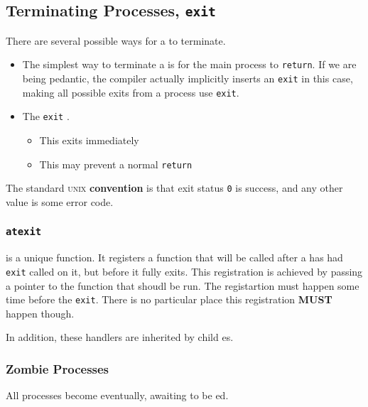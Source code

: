 \subsection{Terminating Processes, \texttt{exit}}\label{subsec:Terminating_Processes-exit}
There are several possible ways for a  to terminate.

\begin{itemize}[noitemsep]
\item The simplest way to terminate a  is for the main process to \texttt{return}.
  If we are being pedantic, the compiler actually implicitly inserts an \texttt{exit} in this case, making all possible exits from a process use \texttt{exit}.

\item The \texttt{exit} .
  \begin{itemize}[noitemsep]
  \item This exits immediately
  \item This may prevent a normal \texttt{return}
  \end{itemize}
\end{itemize}

The standard \textsc{unix} \textbf{convention} is that exit status \texttt{0} is success, and any other value is some error code.

\subsubsection{\texttt{atexit}}\label{subsubsec:atexit}
 is a unique function.
It registers a function that will be called after a  has had \texttt{exit} called on it, but before it fully exits.
This registration is achieved by passing a pointer to the function that shoudl be run.
The registartion must happen some time before the \texttt{exit}.
There is no particular place this registration \textbf{MUST} happen though.

In addition, these handlers are inherited by child es.

\subsubsection{Zombie Processes}\label{subsubsec:Zombie_Processes}
All processes become  eventually, awaiting to be ed.

